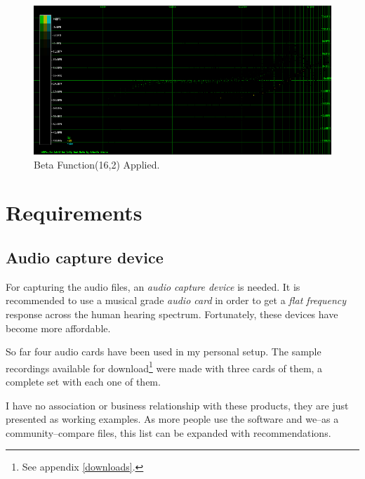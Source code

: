 \documentclass[10pt,a4paper]{report}
\begin{document}
\begin{appendices}
\begin{figure}[H]
	\centering
	\includegraphics[width=1\linewidth]{images/colorfilter/BetaFunctionPlot_5_Data.png}
	\caption[Beta Function(16,2)]{Beta Function(16,2) Applied.}
	\label{fig:betafunctionplot5data}
\end{figure}

\chapter{Requirements}
\label{requirements}
\section{Audio capture device}
\label{audiocards}
For capturing the audio files, an \textit{audio capture device} is needed. It is recommended to use a musical grade \textit{audio card} in order to get a \textit{flat frequency} response across the human hearing spectrum. Fortunately, these devices have become more affordable.

So far four audio cards have been used in my personal setup. The sample recordings available for download\footnote{See appendix \ref{downloads}.} were made with three cards of them, a complete set with each one of them.

I have no association or business relationship with these products, they are just presented as  working examples. As more people use the software and we--as a community--compare files, this list can be expanded with recommendations.


\end{appendices}
\end{document}
